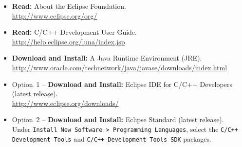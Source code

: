 \documentclass[11pt]{article}
\begin{document}
\begin{itemize}
\item \textbf{Read:} About the Eclipse Foundation. \\
\url{http://www.eclipse.org/org/}
\item \textbf{Read:} C/C++ Development User Guide. \\
\url{http://help.eclipse.org/luna/index.jsp}
\item \textbf{Download and Install:} A Java Runtime Environment (JRE). \\
\url{http://www.oracle.com/technetwork/java/javase/downloads/index.html}
\item Option~1 -- \textbf{Download and Install:} Eclipse IDE for C/C++ Developers (latest release). \\
\url{http://www.eclipse.org/downloads/}
\item Option~2 -- \textbf{Download and Install:} Eclipse Standard (latest release). \\
Under \texttt{Install New Software > Programming Languages}, select the \texttt{C/C++ Development Tools} and \texttt{C/C++ Development Tools SDK} packages.
\end{itemize}
\end{document}
